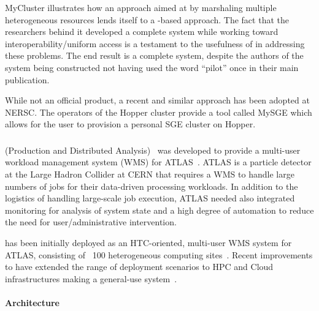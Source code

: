 \documentclass{sig-alternate}
\begin{document}
MyCluster illustrates how an approach aimed at 
by marshaling multiple heterogeneous resources lends itself to a \pilot-based approach. The fact that the researchers behind
it developed a complete \pilot system while working toward
interoperability/uniform access is a testament to the usefulness of \pilots in
addressing these problems. The end result is a complete \pilot system, despite
the authors of the system being constructed not having used the word ``pilot'' once in their main publication.

While not an official product, a recent and similar approach has been adopted
at NERSC. The operators of the Hopper cluster provide a tool called MySGE which
allows for the user to provision a personal SGE cluster on Hopper.

%
%
\subsubsection{\panda}
\label{sec:panda}

\panda (Production and Distributed Analysis)~\cite{1742-6596-331-7-072069} was
developed to provide a multi-user workload management system (WMS) for
ATLAS~\cite{aad2008atlas}. ATLAS is a particle detector at the Large Hadron
Collider at CERN that requires a WMS to handle large numbers of jobs for their
data-driven processing workloads. In addition to the logistics of handling
large-scale job execution, ATLAS needed also integrated monitoring for analysis
of system state and a high degree of automation to reduce the need for
user/administrative intervention.

\panda has been initially deployed as an HTC-oriented, multi-user WMS system
for ATLAS, consisting of ~100 heterogeneous computing
sites~\cite{maeno_pd2p:_2012}.
Recent improvements to \panda have extended the range of deployment scenarios
to HPC and Cloud infrastructures making \panda a general-use \pilot
system~\cite{nilsson2012recent}.

\paragraph{Architecture}
\end{document}
